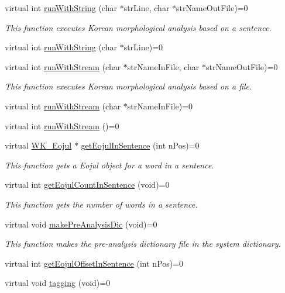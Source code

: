 \begin{CompactItemize}
virtual int \hyperlink{classWK__Analyzer_bb5e8ce81e579f6a33e12a03a3f35a51}{runWithString} (char $\ast$strLine, char $\ast$strNameOutFile)=0
\begin{CompactList}\small\item\em This function executes Korean morphological analysis based on a sentence. \item\end{CompactList}\item 
virtual int \hyperlink{classWK__Analyzer_8ac79b5e3342c0fa1adc587ba48472d6}{runWithString} (char $\ast$strLine)=0
\item 
virtual int \hyperlink{classWK__Analyzer_a5e90adc6d240fcee91c41cf61bcfb16}{runWithStream} (char $\ast$strNameInFile, char $\ast$strNameOutFile)=0
\begin{CompactList}\small\item\em This function executes Korean morphological analysis based on a file. \item\end{CompactList}\item 
virtual int \hyperlink{classWK__Analyzer_baf49aac1b32b7517c51c8cae3cf88b2}{runWithStream} (char $\ast$strNameInFile)=0
\item 
virtual int \hyperlink{classWK__Analyzer_558f318419f56ffefaa2ac6027e2c12a}{runWithStream} ()=0
\item 
virtual \hyperlink{classWK__Eojul}{WK\_\-Eojul} $\ast$ \hyperlink{classWK__Analyzer_719d5064f2d397eff535805c37c8a251}{getEojulInSentence} (int nPos)=0
\begin{CompactList}\small\item\em This function gets a Eojul object for a word in a sentence. \item\end{CompactList}\item 
virtual int \hyperlink{classWK__Analyzer_54e8115a1881d8fb0ed559b960b705c8}{getEojulCountInSentence} (void)=0
\begin{CompactList}\small\item\em This function gets the number of words in a sentence. \item\end{CompactList}\item 
virtual void \hyperlink{classWK__Analyzer_da45001afbdf5c6edd922d80abfd22e7}{makePreAnalysisDic} (void)=0
\begin{CompactList}\small\item\em This function makes the pre-analysis dictionary file in the system dictionary. \item\end{CompactList}\item 
virtual int \hyperlink{classWK__Analyzer_89f47ebc012b22c7762677a12877bc37}{getEojulOffsetInSentence} (int nPos)=0
\item 
virtual void \hyperlink{classWK__Analyzer_4f71176a5b7359b73631bad1c506be21}{tagging} (void)=0
\end{CompactItemize}
